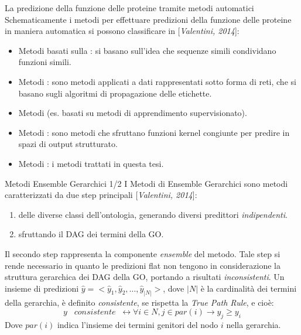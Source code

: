 \documentclass[9pt]{beamer}
\begin{document}
\begin{tframe}{La predizione della funzione delle proteine tramite metodi automatici}
Schematicamente i metodi per effettuare predizioni della funzione delle proteine in maniera automatica si possono classificare in [\emph{Valentini, 2014}]:

\begin{itemize}
\item Metodi basati sulla : si basano sull'idea che sequenze simili condividano funzioni simili.
\item Metodi : sono metodi applicati a dati rappresentati sotto forma di reti, che si basano sugli algoritmi di propagazione delle etichette.
\item Metodi  (es. basati su metodi di apprendimento supervisionato).
\item Metodi : sono metodi che sfruttano funzioni kernel congiunte per predire in spazi di output strutturato.
\item Metodi : i metodi trattati in questa tesi.
\end{itemize}

\end{tframe}

\begin{tframe}{Metodi Ensemble Gerarchici 1/2}
I Metodi di Ensemble Gerarchici sono metodi caratterizzati da due step principali [\emph{Valentini, 2014}]:

\begin{enumerate}
\item {} delle diverse classi dell’ontologia, generando diversi predittori \emph{indipendenti}.
\item {} sfruttando il DAG dei termini della GO.
\end{enumerate}
Il secondo step rappresenta la componente \emph{ensemble} del metodo. Tale step si rende necessario in quanto le predizioni flat non tengono in considerazione la struttura gerarchica dei DAG della GO, portando a risultati \emph{inconsistenti}.
Un insieme di predizioni $\hat{y} = <\hat{y}_1, \hat{y}_2, \dots, \hat{y}_{|N|}>$, dove $|N|$ è la cardinalità dei termini della gerarchia, è definito \emph{consistente}, se rispetta la \emph{True Path Rule}, e cioè:
\[
y\;\;\;consistente\;\; \leftrightarrow \forall i \in N, j \in par(i) \rightarrow y_j \geq y_i
\] 
Dove $par(i)$ indica l'insieme dei termini genitori del nodo $i$ nella gerarchia.
\endblock{}
\end{tframe}
\end{document}
